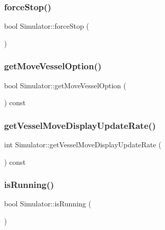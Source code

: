 \mbox{\label{class_simulator_aeb94927d5a555a6a64170f402f6f4618}} 
\subsubsection{\texorpdfstring{forceStop()}{forceStop()}}
{\footnotesize\ttfamily bool Simulator\+::force\+Stop (\begin{DoxyParamCaption}{ }\end{DoxyParamCaption})}

\mbox{\label{class_simulator_af76678a2bc976025f05f2f3b0be15e07}} 
\subsubsection{\texorpdfstring{getMoveVesselOption()}{getMoveVesselOption()}}
{\footnotesize\ttfamily bool Simulator\+::get\+Move\+Vessel\+Option (\begin{DoxyParamCaption}{ }\end{DoxyParamCaption}) const}

\mbox{\label{class_simulator_a49429cdd50f3d19d1b0456df42b97762}} 
\subsubsection{\texorpdfstring{getVesselMoveDisplayUpdateRate()}{getVesselMoveDisplayUpdateRate()}}
{\footnotesize\ttfamily int Simulator\+::get\+Vessel\+Move\+Display\+Update\+Rate (\begin{DoxyParamCaption}{ }\end{DoxyParamCaption}) const}

\mbox{\label{class_simulator_a166832314a3c4c510c28771372c372b6}} 
\subsubsection{\texorpdfstring{isRunning()}{isRunning()}}
{\footnotesize\ttfamily bool Simulator\+::is\+Running (\begin{DoxyParamCaption}{ }\end{DoxyParamCaption})}

